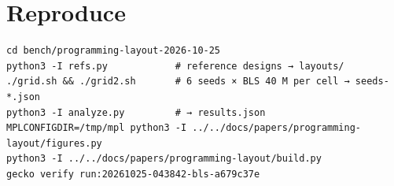 \documentclass{gecko-paper}
\begin{document}
{\section{Reproduce}

\begin{verbatim}
cd bench/programming-layout-2026-10-25
python3 -I refs.py            # reference designs → layouts/
./grid.sh && ./grid2.sh       # 6 seeds × BLS 40 M per cell → seeds-*.json
python3 -I analyze.py         # → results.json
MPLCONFIGDIR=/tmp/mpl python3 -I ../../docs/papers/programming-layout/figures.py
python3 -I ../../docs/papers/programming-layout/build.py
gecko verify run:20261025-043842-bls-a679c37e
\end{verbatim}

}
\end{document}
